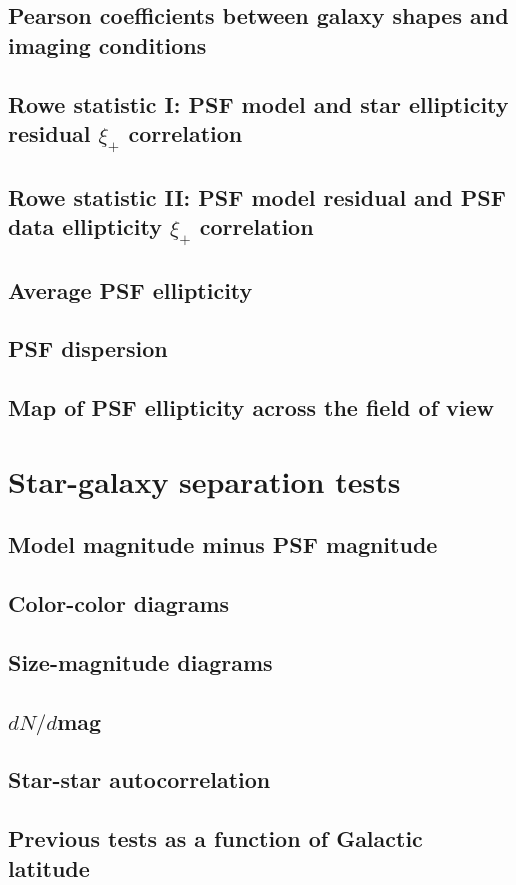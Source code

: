 \documentclass{article}
\begin{document}
\subsection{Pearson coefficients between galaxy shapes and imaging conditions}

\subsection{Rowe statistic I: PSF model and star ellipticity residual $\xi_+$ correlation}

\subsection{Rowe statistic II: PSF model residual and PSF data ellipticity $\xi_+$ correlation}

\subsection{Average PSF ellipticity}

\subsection{PSF dispersion}

\subsection{Map of PSF ellipticity across the field of view}

\section{Star-galaxy separation tests}

\subsection{Model magnitude minus PSF magnitude}

\subsection{Color-color diagrams}

\subsection{Size-magnitude diagrams}

\subsection{$dN/d$mag}

\subsection{Star-star autocorrelation}

\subsection{Previous tests as a function of Galactic latitude}
\end{document}
